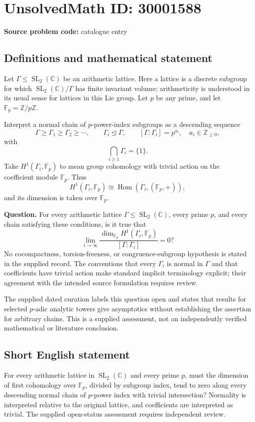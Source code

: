 \documentclass[11pt]{article}
\newcommand{\Z}{\mathbb{Z}}
\newcommand{\C}{\mathbb{C}}
\newcommand{\F}{\mathbb{F}}
\begin{document}
\section*{UnsolvedMath ID: 30001588}
\textbf{Source problem code:} catalogue entry
\subsection{Definitions and mathematical statement}
Let \(\Gamma\leq \operatorname{SL}_2(\C)\) be an arithmetic lattice. Here a lattice is a discrete subgroup for which \(\operatorname{SL}_2(\C)/\Gamma\) has finite invariant volume; arithmeticity is understood in its usual sense for lattices in this Lie group. Let \(p\) be any prime, and let \(\F_p=\Z/p\Z\).

Interpret a normal chain of \(p\)-power-index subgroups as a descending sequence
\[
\Gamma\geq\Gamma_1\geq\Gamma_2\geq\cdots,
\qquad \Gamma_i\trianglelefteq\Gamma,
\qquad [\Gamma:\Gamma_i]=p^{a_i},\quad a_i\in\Z_{\geq0},
\]
with
\[
\bigcap_{i\geq1}\Gamma_i=\{1\}.
\]
Take \(H^1(\Gamma_i,\F_p)\) to mean group cohomology with trivial action on the coefficient module \(\F_p\). Thus
\[
H^1(\Gamma_i,\F_p)\cong\operatorname{Hom}(\Gamma_i,(\F_p,+)),
\]
and its dimension is taken over \(\F_p\).

\textbf{Question.} For every arithmetic lattice \(\Gamma\leq\operatorname{SL}_2(\C)\), every prime \(p\), and every chain satisfying these conditions, is it true that
\[
\lim_{i\to\infty}
\frac{\dim_{\F_p}H^1(\Gamma_i,\F_p)}{[\Gamma:\Gamma_i]}=0?
\]
No cocompactness, torsion-freeness, or congruence-subgroup hypothesis is stated in the supplied record. The conventions that every \(\Gamma_i\) is normal in \(\Gamma\) and that coefficients have trivial action make standard implicit terminology explicit; their agreement with the intended source formulation requires review.

The supplied dated curation labels this question open and states that results for selected \(p\)-adic analytic towers give asymptotics without establishing the assertion for arbitrary chains. This is a supplied assessment, not an independently verified mathematical or literature conclusion.
\subsection{Short English statement}
For every arithmetic lattice in \(\operatorname{SL}_2(\C)\) and every prime \(p\), must the dimension of first cohomology over \(\F_p\), divided by subgroup index, tend to zero along every descending normal chain of \(p\)-power index with trivial intersection? Normality is interpreted relative to the original lattice, and coefficients are interpreted as trivial. The supplied open-status assessment requires independent review.
\end{document}
